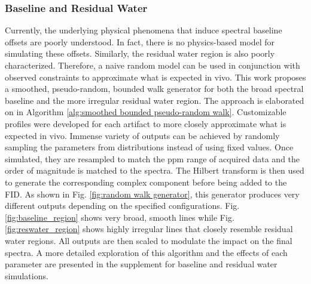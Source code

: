 % 




 
\subsubsection{Baseline and Residual Water}


Currently, the underlying physical phenomena that induce spectral baseline offsets are poorly understood. In fact, there is no physics-based model for simulating these offsets. Similarly, the residual water region is also poorly characterized. Therefore, a naive random model can be used in conjunction with observed constraints to approximate what is expected in vivo. This work proposes a smoothed, pseudo-random, bounded walk generator for both the broad spectral baseline and the more irregular residual water region. The approach is elaborated on in Algorithm \ref{alg:smoothed bounded pseudo-random walk}. Customizable profiles were developed for each artifact to more closely approximate what is expected in vivo. Immense variety of outputs can be achieved by randomly sampling the parameters from distributions instead of using fixed values. Once simulated, they are resampled to match the ppm range of acquired data and the order of magnitude is matched to the spectra. The Hilbert transform is then used to generate the corresponding complex component before being added to the FID. As shown in Fig. \ref{fig:random walk generator}, this generator produces very different outputs depending on the specified configurations. Fig. \ref{fig:baseline_region} shows very broad, smooth lines while Fig. \ref{fig:reswater_region} shows highly irregular lines that closely resemble residual water regions. All outputs are then scaled to modulate the impact on the final spectra. A more detailed exploration of this algorithm and the effects of each parameter are presented in the supplement for baseline and residual water simulations.

